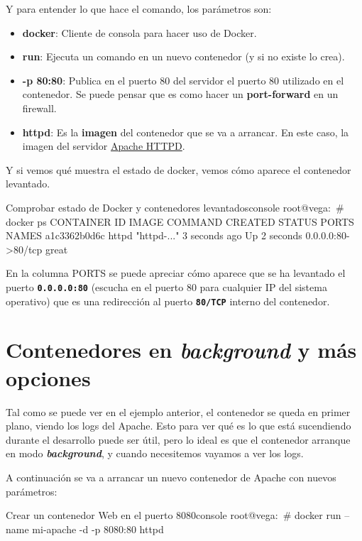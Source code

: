 Y para entender lo que hace el comando, los parámetros son:
\begin{itemize}
    \item \textbf{docker}: Cliente de consola para hacer uso de Docker.
    \item \textbf{run}: Ejecuta un comando en un nuevo contenedor (y si no existe lo crea).
    \item \textbf{-p 80:80}: Publica en el puerto 80 del servidor el puerto 80 utilizado en el contenedor. Se puede pensar que es como hacer un \textbf{port-forward} en un firewall.
    \item \textbf{httpd}: Es la \textbf{imagen} del contenedor que se va a arrancar. En este caso, la imagen del servidor \href{https://hub.docker.com/_/httpd}{Apache HTTPD}.
\end{itemize}

Y si vemos qué muestra el estado de docker, vemos cómo aparece el contenedor levantado.

\begin{mycode}{Comprobar estado de Docker y contenedores levantados}{console}{{\scriptsize }}
root@vega:~# docker ps
CONTAINER ID   IMAGE     COMMAND       CREATED         STATUS         PORTS               NAMES
a1c3362b0d6c   httpd     "httpd-..."   3 seconds ago   Up 2 seconds   0.0.0.0:80->80/tcp  great
\end{mycode}

En la columna PORTS se puede apreciar cómo aparece que se ha levantado el puerto  \textbf{ \texttt{0.0.0.0:80} } (escucha en el puerto 80 para cualquier IP del sistema operativo) que es una redirección al puerto \textbf{\texttt{80/TCP}} interno del contenedor.


\section{Contenedores en \textit{background} y más opciones}
Tal como se puede ver en el ejemplo anterior, el contenedor se queda en primer plano, viendo los logs del Apache. Esto para ver qué es lo que está sucendiendo durante el desarrollo puede ser útil, pero lo ideal es que el contenedor arranque en modo \textbf{\textit{background}}, y cuando necesitemos vayamos a ver los logs.


A continuación se va a arrancar un nuevo contenedor de Apache con nuevos parámetros:
\begin{mycode}{Crear un contenedor Web en el puerto 8080}{console}{}
root@vega:~# docker run --name mi-apache -d -p 8080:80 httpd
\end{mycode}

